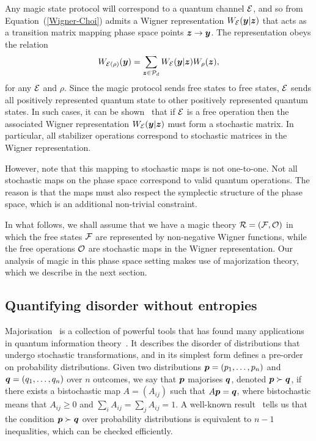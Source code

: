 \documentclass[pra,
aps,
twocolumn,
superscriptaddress,
groupedaddress,
nofootinbib,
reprint
]{revtex4-1}
\begin{document}
Any magic state protocol will correspond to a quantum channel ${\mathcal E}$, and so from Equation~(\ref{Wigner-Choi}) admits a Wigner representation $W_{{\mathcal E}}( \boldsymbol{y} | \bm{z})$ that acts as a transition matrix mapping phase space points $\bm{z} \rightarrow \boldsymbol{y}$. The representation obeys the relation 
\begin{equation}
	W_{{\mathcal E}(\rho)} (\boldsymbol{y}) = \sum_{\bm{z} \in {\mathcal P}_d} W_{{\mathcal E}}( \boldsymbol{y} | \bm{z}) W_\rho(\bm{z}),
\end{equation}
for any ${\mathcal E}$ and $\rho$. Since the magic protocol sends free states to free states, ${\mathcal E}$ sends all positively represented quantum state to other positively represented quantum states. In such cases, it can be shown~\cite{Wang_2019} that if ${\mathcal E}$ is a free operation then the associated Wigner representation $W_{{\mathcal E}}(\boldsymbol{y} |\bm{z})$ must form a stochastic matrix. In particular, all stabilizer operations correspond to stochastic matrices in the Wigner representation. 

However, note that this mapping to stochastic maps is not one-to-one. Not all stochastic maps on the phase space correspond to valid quantum operations. The reason is that the maps must also respect the symplectic structure of the phase space, which is an additional non-trivial constraint.

In what follows, we shall assume that we have a magic theory ${\mathcal R} = ({\mathcal F}, {\mathcal O})$ in which the free states ${\mathcal F}$ are represented by non-negative Wigner functions, while the free operations ${\mathcal O}$ are stochastic maps in the Wigner representation. Our analysis of magic in this phase space setting makes use of majorization theory, which we describe in the next section.



\subsection{Quantifying disorder without entropies}
\label{sec:major}

Majorisation~\cite{cit:marshall, Blackwell_1953} is a collection of powerful tools that has found many applications in quantum information theory~\cite{Nielsen_1999, cit:cwiklinski, cit:lostaglio2, cit:gour, cit:gour2, Horodecki_2003, Vallejos_2021}.
It describes the disorder of distributions that undergo stochastic transformations, and in its simplest form defines a pre-order on probability distributions. Given two distributions $\boldsymbol{p}= (p_1, \dots, p_n)$ and $\boldsymbol{q} = (q_1, \dots, q_n)$ over $n$ outcomes, we say that $\boldsymbol{p}$ majorises $\boldsymbol{q}$, denoted $\boldsymbol{p} \succ \boldsymbol{q}$, if there exists a bistochastic map $A = (A_{ij})$ such that $A\boldsymbol{p} = \boldsymbol{q}$, where bistochastic means that $A_{ij} \geq 0$ and $\sum_i A_{ij} = \sum_j A_{ij} = 1$. A well-known result~\cite{cit:marshall} tells us that the condition $ \boldsymbol{p} \succ \boldsymbol{q}$ over probability distributions is equivalent to $n-1$ inequalities, which can be checked efficiently.
\end{document}

